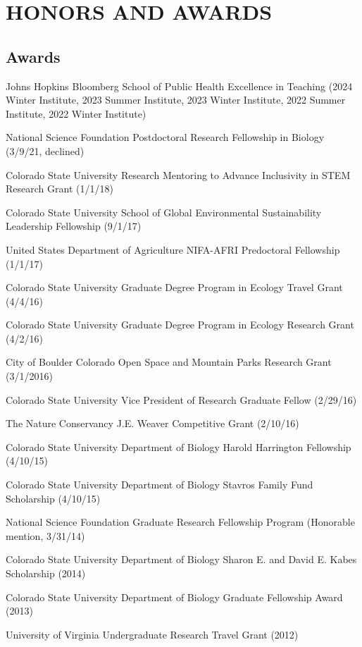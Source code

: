 \documentclass{cv}
\begin{document}
\section*{HONORS AND AWARDS}

\subsection*{Awards}

Johns Hopkins Bloomberg School of Public Health Excellence in Teaching (2024 Winter Institute, 2023 Summer Institute, 2023 Winter Institute, 2022 Summer Institute, 2022 Winter Institute)
	
National Science Foundation Postdoctoral Research Fellowship in Biology (3/9/21, declined) %

Colorado State University Research Mentoring to Advance Inclusivity in STEM Research Grant (1/1/18) %

Colorado State University School of Global Environmental Sustainability Leadership Fellowship (9/1/17) 

United States Department of Agriculture NIFA-AFRI Predoctoral Fellowship (1/1/17) %

Colorado State University Graduate Degree Program in Ecology Travel Grant (4/4/16) %

Colorado State University Graduate Degree Program in Ecology Research Grant (4/2/16) %

City of Boulder Colorado Open Space and Mountain Parks Research Grant (3/1/2016) %

Colorado State University Vice President of Research Graduate Fellow (2/29/16) %

The Nature Conservancy J.E. Weaver Competitive Grant (2/10/16) %

Colorado State University Department of Biology Harold Harrington Fellowship (4/10/15) %

Colorado State University Department of Biology Stavros Family Fund Scholarship (4/10/15) %

National Science Foundation Graduate Research Fellowship Program (Honorable mention, 3/31/14) 

Colorado State University Department of Biology Sharon E. and David E. Kabes Scholarship (2014) %

Colorado State University Department of Biology Graduate Fellowship Award (2013) %

University of Virginia Undergraduate Research Travel Grant (2012) %
\end{document}

